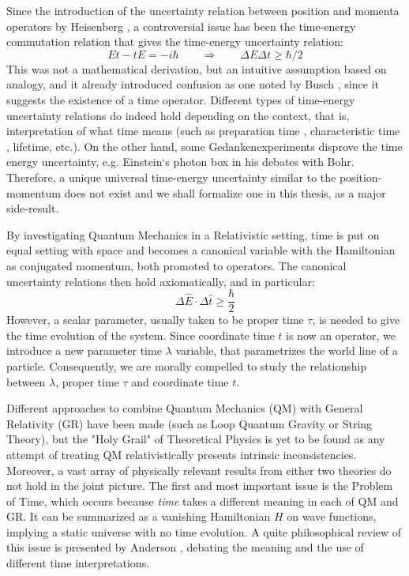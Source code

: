 \documentclass[twoside,a4paper,11pt]{article}
\numberwithin{equation}{section}
\begin{document}
Since the introduction of the uncertainty relation between position and momenta operators by Heisenberg \cite{HeisenbergUR}, a controversial issue has been the time-energy commutation relation that gives the time-energy uncertainty relation:
\begin{equation}
    Et - tE = -i\hbar \qquad \Rightarrow \qquad  \Delta E \Delta t \geq  \hbar/2
\end{equation}
This was not a mathematical derivation, but an intuitive assumption based on analogy, and it already introduced confusion as one noted by Busch \cite{BuschTEUR}, since  it suggests the existence of a time operator. Different types of time-energy uncertainty relations do indeed hold depending on the context, that is, interpretation of what time means (such as preparation time \cite{AharonovBohm}, characteristic time \cite{MandelstamTEUR}, lifetime, etc.). On the other hand, some Gedankenexperiments  disprove the time energy uncertainty, e.g. Einstein`s photon box in his debates with Bohr. Therefore, a unique universal time-energy uncertainty similar to the position-momentum does not exist and we shall formalize one in this thesis, as a major side-result.

By investigating Quantum Mechanics in a Relativistic setting, time is put on equal setting with space and becomes a canonical variable with the Hamiltonian as conjugated momentum, both promoted to operators. The canonical uncertainty relations then \cite{HeisenbergUR} hold axiomatically, and in particular:
\begin{equation}
   \Delta \hat{E}  \cdot \Delta \hat{t}  \geq \frac{\hbar }{2}
\end{equation}
However, a scalar parameter, usually taken to be proper time $\tau$, is needed to give the time evolution of the system. Since coordinate time $t$ is now an operator, we introduce a new parameter time $\lambda$ variable, that parametrizes the world line of a particle. Consequently, we are morally compelled to study the relationship between $\lambda$, proper time $\tau$ and coordinate time $t$.

Different approaches to combine Quantum Mechanics (QM) with General Relativity (GR) have been made (such as Loop Quantum Gravity or String Theory), but the "Holy Grail" of Theoretical Physics is yet to be found as any attempt of treating QM relativistically presents intrinsic inconsistencies. Moreover, a vast array of physically relevant results from either two theories do not hold in the joint picture. The first and most important issue is the Problem of Time, which occurs because \textit{time} takes a different meaning in each of QM and GR. It can be summarized as a vanishing Hamiltonian $H$ on wave functions, implying a static universe with no time evolution. A quite philosophical review of this issue is presented by Anderson \cite{AndersonTimeQG}, debating the meaning and the use of different time interpretations. 
\end{document}
